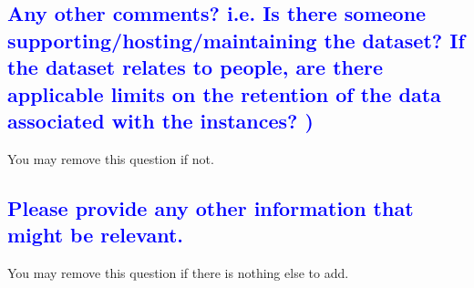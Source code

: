\documentclass[letterpaper, 10 pt, conference]{ieeeconf}  %
\begin{document}
\textcolor{blue}{\subsection{Any other comments? i.e. Is there someone supporting/hosting/maintaining the dataset? If the dataset relates to people, are there applicable limits on the retention of the data associated with the instances? )}}

You may remove this question if not.
\\


\textcolor{blue}{\subsection{Please provide any other information that might be relevant.}}

You may remove this question if there is nothing else to add.



\medskip
 
  

\end{document}
